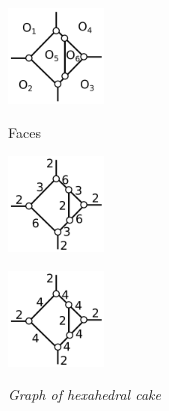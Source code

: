 \documentclass[suppldata, dvipdfmx]{interact}
\theoremstyle{plain}%
\theoremstyle{definition}
\theoremstyle{remark}
\theoremstyle{problemstyle}
\begin{document}
\begin{figure}[h!tbp]
  \begin{minipage}[t]{0.5\textwidth}
   \centering
   \includegraphics[width=1in, keepaspectratio]{./img/HexahedraWithSphericalFaces/hexahedralCake3/hexahedralCake3Faces.png}
   \caption{Faces}
   \label{}
  \end{minipage}
 \hspace*{\fill}
 \begin{minipage}[t]{0.5\textwidth}
  \begin{minipage}[t]{0.25\textwidth}
   \centering
   \includegraphics[width=1in, keepaspectratio]{./img/HexahedraWithSphericalFaces/hexahedralCake3/hexahedralCake3_a.png}
   \subcaption{}
   \label{}
  \end{minipage}
 \hspace*{\fill}
  \begin{minipage}[t]{0.25\textwidth}
   \centering
   \includegraphics[width=1in, keepaspectratio]{./img/HexahedraWithSphericalFaces/hexahedralCake3/hexahedralCake3_b.png}
   \subcaption{}
   \label{}
  \end{minipage}
 \hspace*{\fill}
  \caption{\textit{Graph of hexahedral cake}}
  \label{}
 \end{minipage}
\end{figure}
\end{document}
